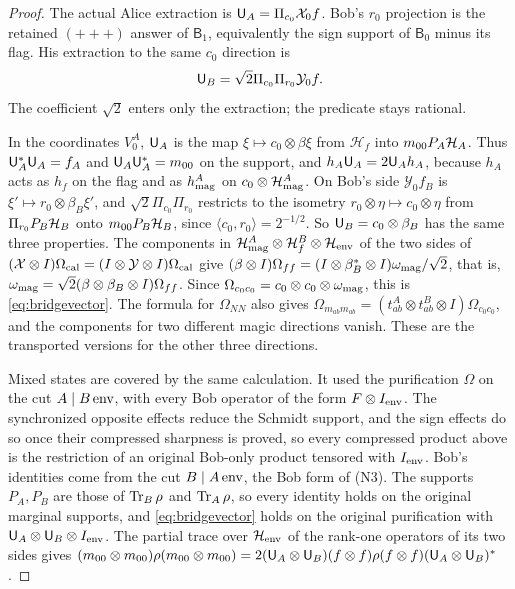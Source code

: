 \begin{proof}
The actual Alice extraction is ${\mathsf U}_A=\Pi_{c_0}\mathcal X_0f$. Bob's $r_0$ projection is the retained $(+++)$ answer of $\mathsf B_1$, equivalently the sign support of $\mathsf B_0$ minus its flag. His extraction to the same $c_0$ direction is
\[
 {\mathsf U}_B=\sqrt2\Pi_{c_0}\Pi_{r_0}\mathcal Y_0f.
\]
The coefficient $\sqrt2$ enters only the extraction; the predicate stays rational.

In the coordinates $V^A_0$, ${\mathsf U}_A$ is the map $\xi\mapsto c_0\otimes\beta\xi$ from $\mathcal H_f$ into $m_{00}P_A\mathcal H_A$. Thus ${\mathsf U}_A^*{\mathsf U}_A=f_A$ and ${\mathsf U}_A{\mathsf U}_A^*=m_{00}$ on the support, and $h_A{\mathsf U}_A=2{\mathsf U}_Ah_A$, because $h_A$ acts as $h_f$ on the flag and as $h^A_{\rm mag}$ on $c_0\otimes\mathcal H^A_{\rm mag}$. On Bob's side $\mathcal Y_0f_B$ is $\xi'\mapsto r_0\otimes\beta_B\xi'$, and $\sqrt2\Pi_{c_0}\Pi_{r_0}$ restricts to the isometry $r_0\otimes\eta\mapsto c_0\otimes\eta$ from $\Pi_{r_0}P_B\mathcal H_B$ onto $m_{00}P_B\mathcal H_B$, since $\langle c_0,r_0\rangle=2^{-1/2}$. So ${\mathsf U}_B=c_0\otimes\beta_B$ has the same three properties. The components in $\mathcal H^A_{\rm mag}\otimes\mathcal H^B_f\otimes\mathcal H_{\rm env}$ of the two sides of $(\mathcal X\otimes I)\Omega_{\rm cal}=(I\otimes\mathcal Y\otimes I)\Omega_{\rm cal}$ give $(\beta\otimes I)\Omega_{ff}=(I\otimes\beta_B^*\otimes I)\omega_{\rm mag}/\sqrt2$, that is, $\omega_{\rm mag}=\sqrt2(\beta\otimes\beta_B\otimes I)\Omega_{ff}$. Since $\Omega_{c_0c_0}=c_0\otimes c_0\otimes\omega_{\rm mag}$, this is \eqref{eq:bridgevector}. The formula for $\Omega_{NN}$ also gives $\Omega_{m_{ab}m_{ab}}=(t^A_{ab}\otimes t^B_{ab}\otimes I)\Omega_{c_0c_0}$, and the components for two different magic directions vanish. These are the transported versions for the other three directions.

Mixed states are covered by the same calculation. It used the purification $\Omega$ on the cut $A\mid B\,{\rm env}$, with every Bob operator of the form $F\otimes I_{\rm env}$. The synchronized opposite effects reduce the Schmidt support, and the sign effects do so once their compressed sharpness is proved, so every compressed product above is the restriction of an original Bob-only product tensored with $I_{\rm env}$. Bob's identities come from the cut $B\mid A\,{\rm env}$, the Bob form of (N3). The supports $P_A,P_B$ are those of $\operatorname{Tr}_B\rho$ and $\operatorname{Tr}_A\rho$, so every identity holds on the original marginal supports, and \eqref{eq:bridgevector} holds on the original purification with ${\mathsf U}_A\otimes {\mathsf U}_B\otimes I_{\rm env}$. The partial trace over $\mathcal H_{\rm env}$ of the rank-one operators of its two sides gives $(m_{00}\otimes m_{00})\rho(m_{00}\otimes m_{00})=2({\mathsf U}_A\otimes {\mathsf U}_B)(f\otimes f)\rho(f\otimes f)({\mathsf U}_A\otimes {\mathsf U}_B)^*$.
\end{proof}

